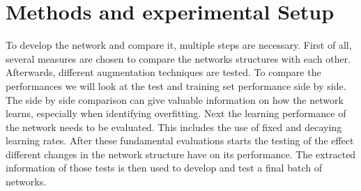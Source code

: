 \documentclass[
a4paper, 
12pt,
grayscalebody, %
abstract=on,
twoside, BCOR10mm, 12pt, DIV13,headinclude, footexclude, final, abstracton, openright
]{ibireprt}
\numberwithin{equation}{chapter}
\numberwithin{table}{chapter}
\numberwithin{figure}{chapter}
\numberwithin{algorithm}{chapter}
\numberwithin{example}{chapter}
\numberwithin{example}{chapter}
\begin{document}

\chapter{Methods and experimental Setup }
To develop the network and compare it, multiple steps are necessary. First of all, several measures are chosen to compare the networks structures with each other. Afterwards, different augmentation techniques are tested. To compare the performances we will look at the test and training set performance side by side. The side by side comparison can give valuable information on how the network learns, especially when identifying overfitting. Next the learning performance of the network needs to be evaluated. This includes the use of fixed and decaying learning rates. After these fundamental evaluations starts the testing of the effect different changes in the network structure have on its performance. The extracted information of those tests is then used to develop and test a final batch of networks.
\end{document}
